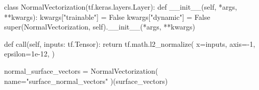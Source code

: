 \begin{listing}[H]
  \caption{%
    TODO.
  }%
  \label{code:l2-normalization}
  \begin{pythoncode}
  class NormalVectorization(tf.keras.layers.Layer):
    def __init__(self, *args, **kwargs):
        kwargs["trainable"] = False
        kwargs["dynamic"] = False
        super(NormalVectorization, self).__init__(*args, **kwargs)

    def call(self, inputs: tf.Tensor):
        return tf.math.l2_normalize(
            x=inputs,
            axis=-1,
            epsilon=1e-12,
        )
  \end{pythoncode}
\end{listing}

\begin{listing}[H]
  \caption{%
    TODO.
  }%
  \label{code:l2-normalization-use}
  \begin{pythoncode}
  normal_surface_vectors = NormalVectorization(
      name="surface_normal_vectors"
  )(surface_vectors)
  \end{pythoncode}
\end{listing}
